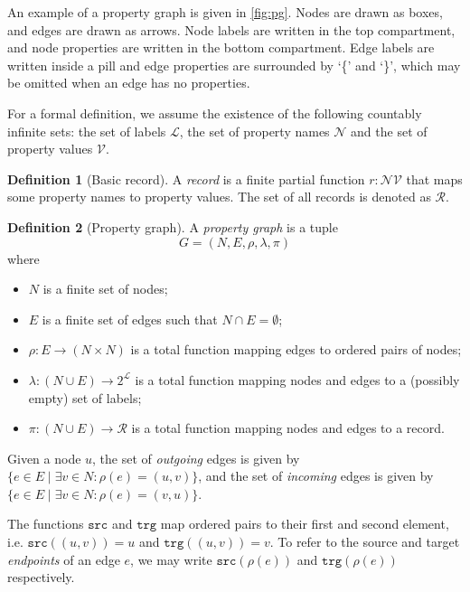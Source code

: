 \documentclass{report}
\makeatletter
\theoremstyle{definition}
\newtheorem{definition}{Definition}
\newcommand{\pto}{}%
\DeclareRobustCommand{\pto}{\mathrel{\mathpalette\p@to@gets\to}}
\newcommand{\p@to@gets}[2]{%
  \ooalign{\hidewidth$\m@th#1\mapstochar\mkern5mu$\hidewidth\cr$\m@th#1\to$\cr}%
}
\newcommand{\src}{\mathtt{src}}
\newcommand{\trg}{\mathtt{trg}}
\makeatother
\begin{document}
An example of a property graph is given in \autoref{fig:pg}. Nodes are drawn as boxes, and edges are drawn as arrows. Node labels are written in the top compartment, and node properties are written in the bottom compartment. Edge labels are written inside a pill and edge properties are surrounded by `\{' and `\}', which may be omitted when an edge has no properties.

For a formal definition, we assume the existence of the following countably infinite sets: the set of labels $\mathcal{L}$, the set of property names $\mathcal{N}$ and the set of property values $\mathcal{V}$.

\begin{definition}[Basic record]
  \label{def:record-basic}
  A \emph{record} is a finite partial function $r : \mathcal{N} \pto \mathcal{V}$ that maps some property names to property values. The set of all records is denoted as $\mathcal{R}$.
\end{definition}

\begin{definition}[Property graph]
  \label{def:pg}
  A \emph{property graph} is a tuple $$G = (N, E, \rho, \lambda, \pi)$$ where
  \begin{itemize}
    \item $N$ is a finite set of nodes;
    \item $E$ is a finite set of edges such that $N \cap E = \emptyset$;
    \item $\rho : E \to (N \times N)$ is a total function mapping edges to ordered pairs of nodes;
    \item $\lambda : (N \cup E) \to 2^{\mathcal{L}}$ is a total function mapping nodes and edges to a (possibly empty) set of labels;
    \item $\pi : (N \cup E) \to \mathcal{R}$ is a total function mapping nodes and edges to a record.
  \end{itemize}
\end{definition}

Given a node $u$, the set of \emph{outgoing} edges is given by $\{e \in E \mid \exists v \in N : \rho(e) = (u, v)\}$, and the set of \emph{incoming} edges is given by $\{e \in E \mid \exists v \in N : \rho(e) = (v, u)\}$.

The functions $\src$ and $\trg$ map ordered pairs to their first and second element, i.e. $\src((u, v)) = u$ and $\trg((u, v)) = v$. To refer to the source and target \emph{endpoints} of an edge $e$, we may write $\src(\rho(e))$ and $\trg(\rho(e))$ respectively.
\end{document}
